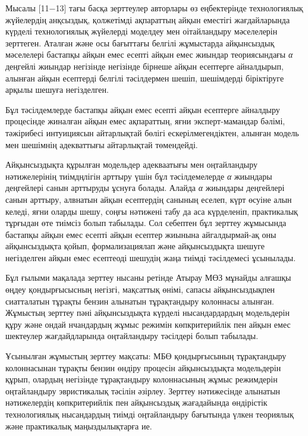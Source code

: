\begin{multicols}{2}
Мысалы {[}11−13{]} тағы басқа зерттеулер авторлары өз еңбектерінде
технологиялық жүйелердің анқсыздық, қолжетімді ақпараттың айқын еместігі
жағдайларында күрделі технологиялық жүйелерді моделдеу мен оітайландыру
мәселелерін зерттеген. Аталған және осы бағыттағы белгілі жұмыстарда
айқынсыздық мәселелері бастапқы айқын емес есепті айқын емес жиындар
теориясындағы \emph{α} деңгейлі жиындар негізінде негізінде бірнеше
айқын есептерге айналдырып, алынған айқын есептерді белгілі тәсілдермен
шешіп, шешімдерді біріктіруге арқылы шешуға негізделген.

Бұл тәсілдемлерде бастапқы айқын емес есепті айқын есептерге айналдыру
процесінде жиналған айқын емес ақпараттың, яғни эксперт-мамандар бәлімі,
тәжірибесі интуициясын айтарлықтай бөлігі ескерілмегендіктен, алынған
модель мен шешімнің адекваттығы айтарлықтай төмендейді.

Айқынсыздықта құрылған модельдер адекваатығы мен оңтайландыру
нәтижелерінің тиімдңлігін арттыру үшін бұл тәсілдемелерде \emph{α}
жиындары деңгейлері санын арттыруды ұснуға болады. Алайда \emph{α}
жиындары деңгейлері санын арттыру, алвнатын айқын есептердің санының
еселеп, күрт өсуіне алын келеді, яғни оларды шешу, соңғы нәтижені табу
да аса күрделеніп, практикалық тұрғыдан өте тиімсіз болып табылады. Сол
себептен бұл зерттеу жұмысында бастапқы айқын емес есепті айқын есептер
жиынына айгалдырмай-ақ оны айқынсыздықта қойып, формализациялап және
айқынсыздықта шешуге негізделген айқын емес есептеоді шешудің жаңа
тиімді тәсілдемесі ұсынылады.

Бұл ғылыми мақалада зерттеу нысаны ретінде Атырау МӨЗ мұнайды алғашқы
өңдеу қондырғысысның негізгі, мақсаттық өнімі, сапасы айқынсыздықпен
сиатталатын тұрақты бензин алынатын тұрақтандыру колоннасы алынған.
Жұмыстың зерттеу пәні айқынсыздықта күрделі нысандардардың модельдерін
құру және ондай нчандардың жұмыс режимін көпкритерийлік пен айқын емес
шектеулер жағдайдларында оңтайландыру тәсілдері болып табылады.

Ұсынылған жұмыстың зерттеу мақсаты: МБӨ қондырғысының тұрақтандыру
колоннасынан тұрақты бензин өндіру процесін айқынсыздықта модельдерін
құрып, олардың негізінде тұрақтандыру колоннасының жұмыс режимдерін
оңтайландыру эвристикалық тәсілін әзірлеу. Зерттеу нәтижесінде алынатын
нәтижелердің көпкритерийлік пен айқынсыздық жағадайында өндірістік
технологиялық нысандардың тиімді оңтайландыру бағытында үлкен теориялық
және практикалық маңыздылықтарға ие.


\end{multicols}
